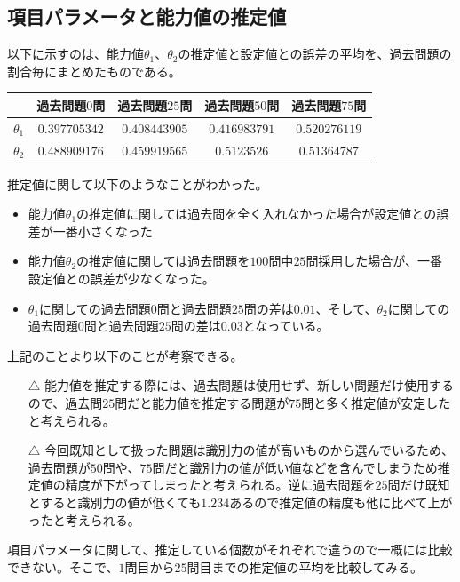 \documentclass[12pt]{jarticle}
\numberwithin{equation}{subsection}
\begin{document}
\subsection{項目パラメータと能力値の推定値}
以下に示すのは、能力値$\theta_1$、$\theta_2$の推定値と設定値との誤差の平均を、過去問題の割合毎にまとめたものである。
\begin{table}[H]
  \begin{center}
    \begin{tabular}{|c||c|c|c|c|} \hline
      & 過去問題$0$問& 過去問題$25$問 & 過去問題$50$問 & 過去問題$75$問\\ \hline \hline
      $\theta_1$ & $0.397705342$	& $0.408443905$	& $0.416983791$	& $0.520276119$ \\ \hline
      $\theta_2$ & $0.488909176$	& $0.459919565$	& $0.5123526$	& $0.51364787$ \\ \hline
    \end{tabular}
  \end{center}
\end{table}
推定値に関して以下のようなことがわかった。
\begin{itemize}
  \item 能力値$\theta_1$の推定値に関しては過去問を全く入れなかった場合が設定値との誤差が一番小さくなった
  \item 能力値$\theta_2$の推定値に関しては過去問題を$100$問中$25$問採用した場合が、一番設定値との誤差が少なくなった。
  \item $\theta_1$に関しての過去問題$0$問と過去問題$25$問の差は$0.01$、そして、$\theta_2$に関しての過去問題$0$問と過去問題$25$問の差は$0.03$となっている。
\end{itemize}
上記のことより以下のことが考察できる。
\begin{itemize}
  \item[$\triangle$] 能力値を推定する際には、過去問題は使用せず、新しい問題だけ使用するので、過去問$25$問だと能力値を推定する問題が$75$問と多く推定値が安定したと考えられる。
  \item[$\triangle$] 今回既知として扱った問題は識別力の値が高いものから選んでいるため、過去問題が$50$問や、$75$問だと識別力の値が低い値などを含んでしまうため推定値の精度が下がってしまったと考えられる。逆に過去問題を$25$問だけ既知とすると識別力の値が低くても$1.234$あるので推定値の精度も他に比べて上がったと考えられる。
\end{itemize}
項目パラメータに関して、推定している個数がそれぞれで違うので一概には比較できない。そこで、$1$問目から$25$問目までの推定値の平均を比較してみる。
\end{document}
